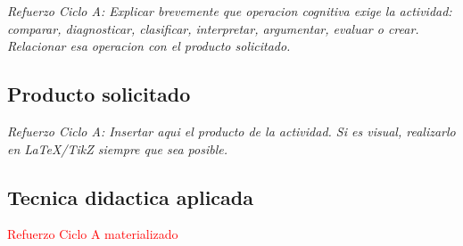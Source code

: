 \documentclass[
	spanish,
	letterpaper, oneside
]{article}
\newcommand{\pendiente}[1]{\textcolor{red}{Refuerzo Ciclo A materializado}}
\begin{document}
\textit{Refuerzo Ciclo A: Explicar brevemente que operacion cognitiva exige la actividad: comparar, diagnosticar, clasificar, interpretar, argumentar, evaluar o crear. Relacionar esa operacion con el producto solicitado.}

\subsection{Producto solicitado}

\textit{Refuerzo Ciclo A: Insertar aqui el producto de la actividad. Si es visual, realizarlo en LaTeX/TikZ siempre que sea posible.}

\subsection{Tecnica didactica aplicada}

\pendiente{Cuando la planeacion indique una tecnica de las 100 Tecnicas Didacticas de Ensenanza y Aprendizaje, explicar aqui como se uso. Ejemplo: "La tecnica seleccionada organiza la informacion mediante criterios visibles, jerarquia y cierre reflexivo; por ello, el producto no solo presenta datos, sino que demuestra analisis y comprension" \citep{unadm100TecnicasDidacticas2023}.}
\end{document}
